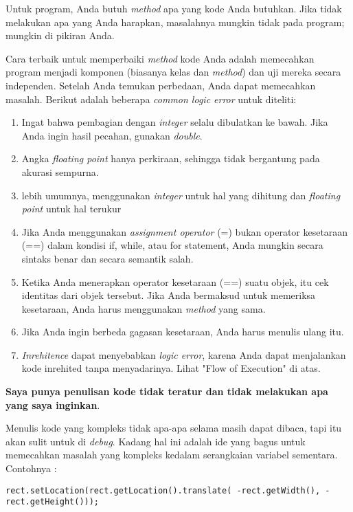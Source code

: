 \documentclass[12pt,b5paper,openright,twoside]{book}
\begin{document}
\noindent Untuk program, Anda butuh \textit{method} apa yang kode Anda butuhkan. Jika tidak melakukan apa yang Anda harapkan, masalahnya mungkin tidak pada program; mungkin di pikiran Anda.

Cara terbaik untuk memperbaiki \textit{method} kode Anda adalah memecahkan program menjadi komponen (biasanya kelas dan \textit{method}) dan uji mereka secara independen. Setelah Anda temukan perbedaan, Anda dapat memecahkan masalah.
Berikut adalah beberapa \textit{common logic error} untuk diteliti:
\begin{enumerate}
    \item Ingat bahwa pembagian dengan \textit{integer} selalu dibulatkan ke bawah. Jika Anda ingin hasil pecahan, gunakan \textit{double}.
    \item Angka \textit{floating point} hanya perkiraan, sehingga tidak bergantung pada akurasi sempurna.
    \item lebih umumnya, menggunakan \textit{integer} untuk hal yang dihitung dan \textit{floating point} untuk hal terukur
    \item Jika Anda menggunakan \textit{assignment operator} (=) bukan operator kesetaraan (==) dalam kondisi if, while, atau for statement, Anda mungkin secara sintaks benar dan secara semantik salah.
    \item Ketika Anda menerapkan operator kesetaraan (==) suatu objek, itu cek identitas dari objek tersebut. Jika Anda bermaksud untuk memeriksa kesetaraan, Anda harus menggunakan \textit{method} yang sama.
    \item Jika Anda ingin berbeda gagasan kesetaraan, Anda harus menulis ulang itu.
    \item \textit{Inrehitence} dapat menyebabkan \textit{logic error}, karena Anda dapat menjalankan kode inrehited tanpa menyadarinya. Lihat "Flow of Execution" di atas.
\end{enumerate}

\noindent \textbf{Saya punya penulisan kode tidak teratur dan tidak melakukan apa yang saya inginkan}.

\noindent Menulis kode yang kompleks tidak apa-apa selama masih dapat dibaca, tapi itu akan sulit untuk di \textit{debug}. Kadang hal ini adalah ide yang bagus untuk memecahkan masalah yang kompleks kedalam serangkaian variabel sementara.
Contohnya :
\begin{lstlisting}
rect.setLocation(rect.getLocation().translate( -rect.getWidth(), -rect.getHeight()));
\end{lstlisting}
\end{document}
